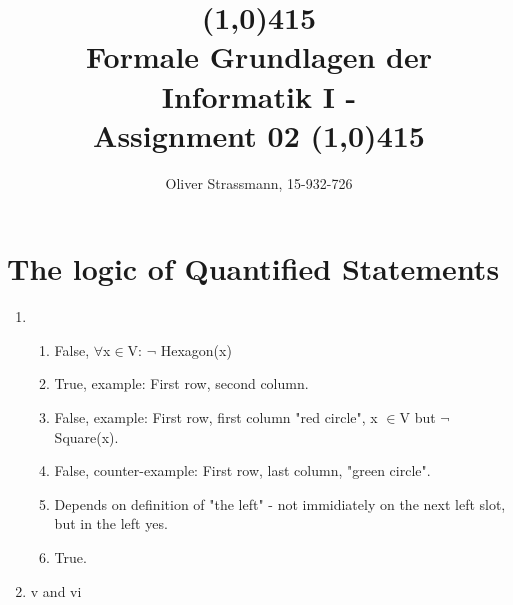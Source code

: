\documentclass{article}
\title{ \line(1,0){415} \\ Formale Grundlagen der Informatik I -\\ Assignment 02 
\line(1,0){415}}
\author{Oliver Strassmann, 15-932-726}
\begin{document}
\maketitle

\section{The logic of Quantified Statements}
\begin{enumerate}[label=\alph*]
		\item
			\begin{enumerate}[label=\roman*]
				\item False, $\forall$x$\in$V: $\neg$ Hexagon(x)
				\item True, example: First row, second column.
				\item False, example: First row, first column "red circle", x $\in$V but $\neg$Square(x).
				\item False, counter-example: First row, last column, "green circle".
				\item Depends on definition of "the left" - not immidiately on the next left slot, but in the left yes.
				\item True.
			\end{enumerate}

		\item v and vi 
\end{enumerate}
\end{document}
